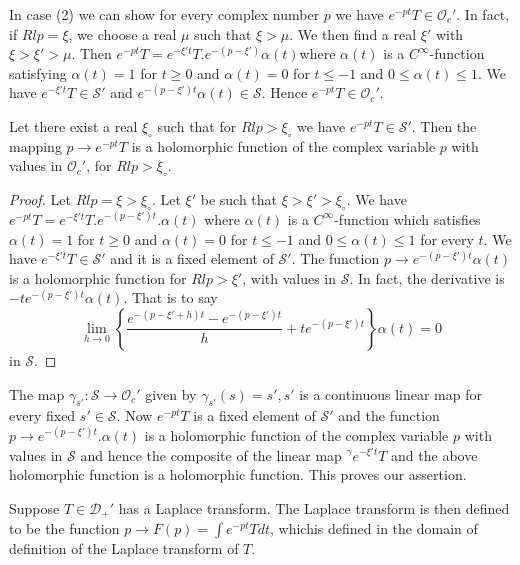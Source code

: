 In case (2) we can show for every complex number $p$ we have $e^{-pt}
T \in \mathscr{O}_c'$. In fact, if $Rl p = \xi$, we choose a real
$\mu$ such that $\xi > \mu$. We then find a real $\xi'$ with $\xi >
\xi' > \mu$. Then $e^{-pt} T = e^{-\xi't}T. e^{-(p-\xi')} \alpha
(t)$\pageoriginale where $\alpha (t)$ is a $C^\infty$-function
satisfying $\alpha (t) = 1$ for $t \geq 0$ and $\alpha (t)  =0$ for $t
\leq -1$ and $0 \leq \alpha (t) \leq 1$. We have $e^{-\xi't}T \in
\mathscr{S}'$ and $e^{-(p-\xi')t} \alpha (t) \in \mathscr{S}$. Hence
$e^{-pt}T \in \mathscr{O}_c'$. 
\begin{prop}\label{chap8:prop8.5}
Let there exist a real $\xi_\circ$ such that for $Rl p > \xi_\circ$ we
have $e^{-pt} T \in \mathscr{S}'$. Then the mapping $p \to e^{-pt}T$
is a holomorphic function of the complex variable $p$ with values in
$\mathscr{O}_c'$, for $Rl p > \xi_\circ$. 
\end{prop}
\begin{proof}
Let $Rl p = \xi > \xi_\circ$. Let $\xi'$ be such that $\xi > \xi' >
\xi_\circ$. We have $e^{-pt} T = e^{-\xi't}T.e^{-(p-\xi')t}.\alpha (t)$
where $\alpha (t)$ is a $C^\infty$-function which satisfies $\alpha
(t) =1$ for $t \geq 0$ and $\alpha (t) = 0$ for $t \leq -1$ and $0
\leq \alpha (t) \leq 1$ for every $t$. We have $e^{-\xi't}T \in
\mathscr{S}'$ and it is a fixed element of $\mathscr{S}'$. The
function $p \to e^{-(p-\xi')t} \alpha (t)$ is a holomorphic function
for $Rl p > \xi'$, with values in $\mathscr{S}$. In fact, the
derivative is $-t e^{-(p-\xi')t}\alpha (t)$. That is to say 
$$
\lim\limits_{h \to 0}
\left\{\frac{e^{-(p-\xi' + h)t}-e^{-(p-\xi')t}}{h}+ t
 e^{-(p-\xi')t}\right\}\alpha (t) = 0
$$
in $\mathscr{S}$.
\end{proof}
The map $\gamma_{s'}: \mathscr{S} \to \mathscr{O}_c'$ given by
$\gamma_{s'} (s) = s', s'$ is a continuous linear map for every fixed
$s' \in \mathscr{S}$. Now $e^{-pt}T$ is a fixed element of
$\mathscr{S}'$ and the function $p \to e^{-(p-\xi')t}. \alpha (t)$ is
a holomorphic function of the complex variable $p$ with values in
$\mathscr{S}$ and hence the composite of the linear map ${}^{\gamma}
e^{-\xi't}T$ and the above holomorphic function is a holomorphic
function. This proves our assertion.
\begin{definition}\label{chap8:def8.4}
Suppose $T \in \mathscr{D}_+'$ has a Laplace transform. The Laplace
transform is then defined to be the function $p \to F(p) = \int
e^{-pt}T dt$, which\pageoriginale is defined in the domain of definition 
of the Laplace transform of $T$.
\end{definition}

